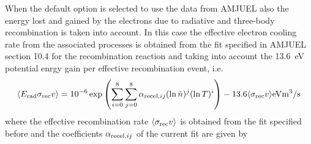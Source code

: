 \documentclass[amsmath,amssymb,a4]{revtex4-2}
\begin{document}
When the default option is selected to use the data from AMJUEL also the energy lost and gained by the electrons due to radiative and three-body recombination is taken into account. In this case the effective electron cooling rate from the associated processes is obtained from the fit specified in AMJUEL section 10.4 for the recombination reaction and taking into account the 13.6~eV potential enrgy gain per effective recombination event, i.e.
\begin{equation}
  \langle E_{\rm rad} \sigma_{\rm rec} v\rangle =  10^{-6} \exp\left( \sum_{i=0}^8\sum_{j=0}^8 \alpha_{{\rm rec el,} ij} (\ln \bar n)^j (\ln T)^i \right) - 13.6 \langle\sigma_{\rm rec} v\rangle  {\rm eV} {\rm m}^3/{\rm s}
\end{equation}
where the effective recombination rate $\langle\sigma_{\rm rec} v\rangle$ is obtained from the fit specified before and the coefficients $\alpha_{{\rm rec el,} ij}$ of the current fit are given by
\end{document}
